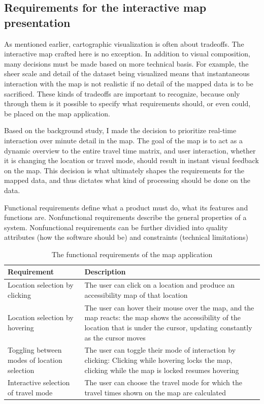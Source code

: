 \subsection{Requirements for the interactive map presentation}

As mentioned earlier, cartographic visualization is often about tradeoffs.
The interactive map crafted here is no exception.
In addition to visual composition,  %
many decisions must be made based on more technical basis.
For example, the sheer scale and detail of the dataset being visualized
means that instantaneous interaction with the map is not realistic
if no detail of the mapped data is to be sacrificed.
These kinds of tradeoffs are important to recognize,
because only through them is it possible to specify what
requirements should, or even could, be placed on the map application.

Based on the background study,  %
I made the decision to prioritize real-time interaction over minute detail in the map.
The goal of the map is to act as a dynamic overview to the entire travel time matrix,
and user interaction, whether it is changing the location or travel mode,
should result in instant visual feedback on the map.
This decision is what ultimately shapes the requirements for the mapped data,
and thus dictates what kind of processing should be done on the data.

Functional requirements define what a product must do,
what its features and functions are.
Nonfunctional requirements describe the general properties of a system.
Nonfunctional requirements can be further dividied into quality attributes
(how the software should be) and constraints (technical limitations)

\begin{table}[H]
	\caption{The functional requirements of the map application}
	\label{tab:functional requirements}
	\centering
	\begin{tabular}{ | L{0.3\textwidth} | L{0.6\textwidth} | }
		\hline
		Requirement
		& Description
		\\
		\hline
		\hline
		Location selection by clicking
		& The user can click on a location and produce an accessibility map of that location
		\\
		\hline
		Location selection by hovering
		& The user can hover their mouse over the map, and the map reacts:
		the map shows the accessibility of the location that is under the cursor,
		updating constantly as the cursor moves
		\\
		\hline
		Toggling between modes of location selection
		& The user can toggle their mode of interaction by clicking:
		Clicking while hovering locks the map, clicking while the map is locked resumes hovering
		\\
		\hline
		Interactive selection of travel mode
		& The user can choose the travel mode for which the travel times shown on the map are calculated
		\\
		\hline
	\end{tabular}
\end{table}

